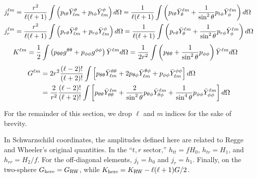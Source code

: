 \documentclass{article}
\begin{document}
\begin{align}
j_t^{\ell m} 
& =
\frac{r^{2}}{\ell (\ell+1)} 
\int \left(
p_{t \theta} \bar{Y}^{\theta}_{\ell m} 
+
p_{t \phi} \bar{Y}^{\phi}_{\ell m} 
\right) d \Omega 
=
\frac{1}{\ell (\ell+1)} 
\int \left(
p_{t \theta} \bar{Y}_{\theta}^{\ell m} 
+
\frac{1}{\sin^{2} \theta} p_{t \phi} \bar{Y}^{\ell m}_{\phi}
\right) d \Omega \\
j_r^{\ell m} 
&=
\frac{r^{2}}{\ell (\ell+1)} 
\int \left(
p_{r \theta} \bar{Y}^{\theta}_{\ell m} 
+
p_{r \phi} \bar{Y}^{\phi}_{\ell m} 
\right) d \Omega 
=
\frac{1}{\ell (\ell+1)} 
\int \left(
p_{r \theta} \bar{Y}^{\ell m}_{ \theta}
+
\frac{1}{\sin^{2} \theta}
p_{r \phi} \bar{Y}^{\ell m}_{ \phi}
\right) d \Omega 
\end{align}
\begin{align}
K^{\ell m} & =
\frac{1}{2}
\int 
\left( 
p_{\theta \theta}  g^{\theta \theta} 
+
p_{\phi \phi}  g^{\phi \phi} 
\right)
\bar{Y}^{\ell m}  d \Omega 
=
\frac{1}{2 r^{2}}
\int 
\left( 
p_{\theta \theta}  
+
\frac{1}{\sin^{2} \theta}
p_{\phi \phi} 
\right)
\bar{Y}^{\ell m}  d \Omega 
\end{align}
\begin{align}
 G^{\ell m} 
 &=
2 r^{2} \frac{(\ell-2)!}{(\ell+2)!}
 \int 
 \left[ 
 p_{\theta \theta} \bar{Y}^{\theta \theta}_{\ell m} 
 +
2 p_{\theta \phi} \bar{Y}^{\theta \phi}_{\ell m} 
 +
 p_{\phi \phi} \bar{Y}^{\phi \phi}_{\ell m}  \right] d \Omega \\
 &=
\frac{2}{r^{2}} \frac{(\ell-2)!}{(\ell+2)!}
 \int 
 \left[ 
 p_{\theta \theta} \bar{Y}_{\theta \theta}^{\ell m} 
 +
\frac{2}{\sin^{2} \theta}
p_{\theta \phi} \bar{Y}_{\theta \phi}^{\ell m} 
 +
 \frac{1}{\sin^{4} \theta}
 p_{\phi \phi} \bar{Y}_{\phi \phi}^{\ell m}  \right] d \Omega 
 \end{align}

For the remainder of this section, we drop $\ell$ and $m$ 
indices for the sake of brevity.

In Schwarzschild coordinates, the amplitudes defined here are related to 
Regge and Wheeler's original quantities.  In the ``$t,r$ sector,'' 
$h_{tt} = f H_{0}$, 
$h_{tr} = H_{1}$,
and 
$h_{rr} = H_{2} / f$.  For the off-diagonal 
elements, $j_{t} = h_{0}$ and
$j_{r} = h_{1}$.  Finally, on the two-sphere 
$G_{\rm here} = G_{\rm RW}$, while
$K_{\rm here} = K_{\rm RW} 
- \ell (\ell + 1) G / 2$.  
\end{document}
